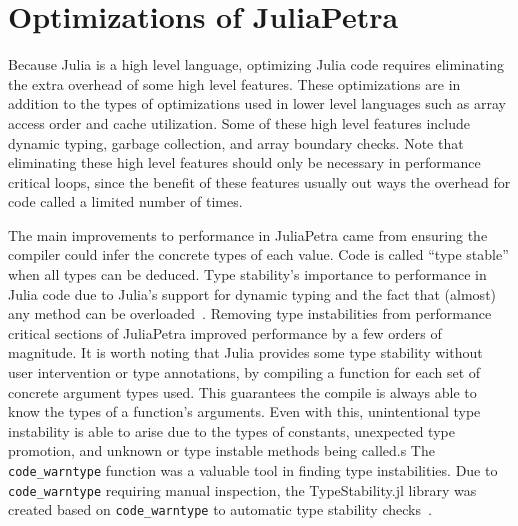 \documentclass[acmsmall]{acmart}
\newcommand{\snippet}[1]{\lstinline{#1}}
\begin{document}
	\section{Optimizations of JuliaPetra}
	
	Because Julia is a high level language, optimizing Julia code requires eliminating the extra overhead of some high level features.
	These optimizations are in addition to the types of optimizations used in lower level languages such as array access order and cache utilization.
	Some of these high level features include dynamic typing, garbage collection, and array boundary checks.
	Note that eliminating these high level features should only be necessary in performance critical loops, since the benefit of these features usually out ways the overhead for code called a limited number of times.
	
	The main improvements to performance in JuliaPetra came from ensuring the compiler could infer the concrete types of each value.
	Code is called ``type stable'' when all types can be deduced.
	Type stability's importance to performance in Julia code due to Julia's support for dynamic typing and the fact that (almost) any method can be overloaded~\cite{Bezanson:2017:FreshApproach}.
	Removing type instabilities from performance critical sections of JuliaPetra improved performance by a few orders of magnitude.
	It is worth noting that Julia provides some type stability without user intervention or type annotations, by compiling a function for each set of concrete argument types used.
	This guarantees the compile is always able to know the types of a function's arguments.
	Even with this, unintentional type instability is able to arise due to the types of constants, unexpected type promotion, and unknown or type instable methods being called.s
	The \snippet{code_warntype} function was a valuable tool in finding type instabilities.
	Due to \snippet{code_warntype} requiring manual inspection, the TypeStability.jl library was created
	based on \snippet{code_warntype} to automatic type stability checks~\cite{Github:TypeStability.jl}.
	
\end{document}
